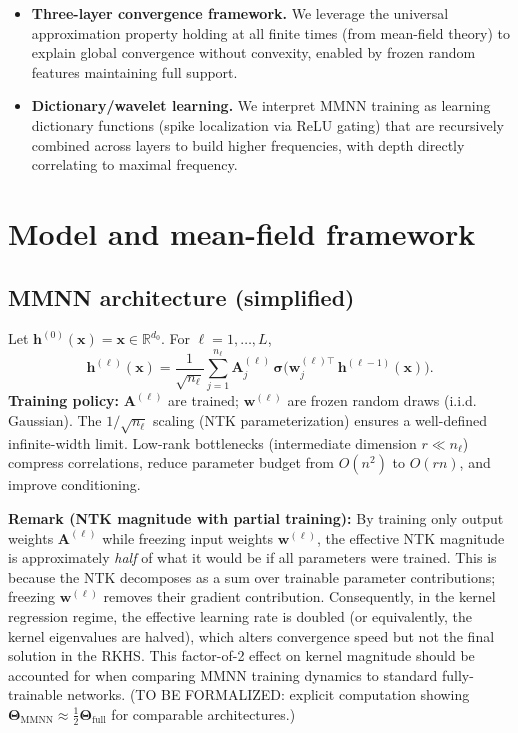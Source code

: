 \documentclass{article}
\DeclareRobustCommand{\ReLU}{\mathrel{\boldsymbol{\sigma}}}
\newcommand{\Kop}{\boldsymbol{\Theta}}
\begin{document}
\begin{itemize}
    \item \textbf{Three-layer convergence framework.} We leverage the universal approximation property holding at all finite times (from mean-field theory) to explain global convergence without convexity, enabled by frozen random features maintaining full support.
    \item \textbf{Dictionary/wavelet learning.} We interpret MMNN training as learning dictionary functions (spike localization via ReLU gating) that are recursively combined across layers to build higher frequencies, with depth directly correlating to maximal frequency.
\end{itemize}

\vspace{2em}
\section{Model and mean-field framework}

\vspace{1em}
\subsection{MMNN architecture (simplified)}
Let \( \bm{h}^{(0)}(\bm{x})=\bm{x}\in\mathbb{R}^{d_0} \). For \( \ell=1,\dots,L \),
\begin{equation}
\label{eq:mmnn}
\bm{h}^{(\ell)}(\bm{x})
= \frac{1}{\sqrt{n_\ell}} \sum_{j=1}^{n_\ell} \bm{A}^{(\ell)}_j\,
\ReLU\!\Big(\bm{w}^{(\ell)\top}_j\,\bm{h}^{(\ell-1)}(\bm{x})\Big).
\end{equation}
\textbf{Training policy:} \( \bm{A}^{(\ell)} \) are trained; \( \bm{w}^{(\ell)} \) are frozen random draws (i.i.d. Gaussian). The \( 1/\sqrt{n_\ell} \) scaling (NTK parameterization) ensures a well-defined infinite-width limit. Low-rank bottlenecks (intermediate dimension \( r\ll n_\ell \)) compress correlations, reduce parameter budget from \( O(n^2) \) to \( O(rn) \), and improve conditioning.

\textbf{Remark (NTK magnitude with partial training):} By training only output weights \( \bm{A}^{(\ell)} \) while freezing input weights \( \bm{w}^{(\ell)} \), the effective NTK magnitude is approximately \emph{half} of what it would be if all parameters were trained. This is because the NTK decomposes as a sum over trainable parameter contributions; freezing \( \bm{w}^{(\ell)} \) removes their gradient contribution. Consequently, in the kernel regression regime, the effective learning rate is doubled (or equivalently, the kernel eigenvalues are halved), which alters convergence speed but not the final solution in the RKHS. This factor-of-2 effect on kernel magnitude should be accounted for when comparing MMNN training dynamics to standard fully-trainable networks. (TO BE FORMALIZED: explicit computation showing \( \Kop_{\text{MMNN}} \approx \tfrac{1}{2} \Kop_{\text{full}} \) for comparable architectures.)
\end{document}
